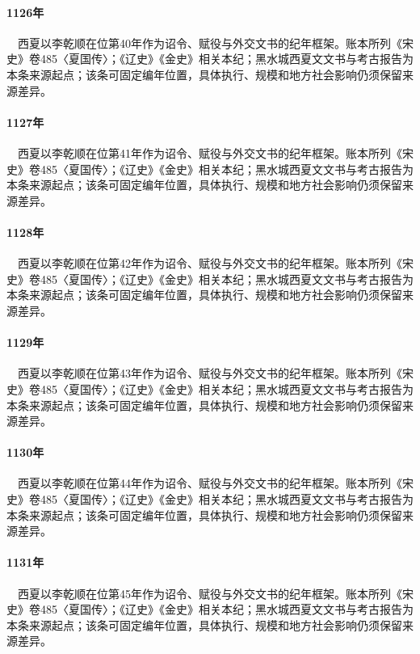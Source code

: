 \paragraph{1126年}　西夏以李乾顺在位第40年作为诏令、赋役与外交文书的纪年框架。账本所列《宋史》卷485〈夏国传〉；《辽史》《金史》相关本纪；黑水城西夏文文书与考古报告为本条来源起点；该条可固定编年位置，具体执行、规模和地方社会影响仍须保留来源差异。

\paragraph{1127年}　西夏以李乾顺在位第41年作为诏令、赋役与外交文书的纪年框架。账本所列《宋史》卷485〈夏国传〉；《辽史》《金史》相关本纪；黑水城西夏文文书与考古报告为本条来源起点；该条可固定编年位置，具体执行、规模和地方社会影响仍须保留来源差异。

\paragraph{1128年}　西夏以李乾顺在位第42年作为诏令、赋役与外交文书的纪年框架。账本所列《宋史》卷485〈夏国传〉；《辽史》《金史》相关本纪；黑水城西夏文文书与考古报告为本条来源起点；该条可固定编年位置，具体执行、规模和地方社会影响仍须保留来源差异。

\paragraph{1129年}　西夏以李乾顺在位第43年作为诏令、赋役与外交文书的纪年框架。账本所列《宋史》卷485〈夏国传〉；《辽史》《金史》相关本纪；黑水城西夏文文书与考古报告为本条来源起点；该条可固定编年位置，具体执行、规模和地方社会影响仍须保留来源差异。

\paragraph{1130年}　西夏以李乾顺在位第44年作为诏令、赋役与外交文书的纪年框架。账本所列《宋史》卷485〈夏国传〉；《辽史》《金史》相关本纪；黑水城西夏文文书与考古报告为本条来源起点；该条可固定编年位置，具体执行、规模和地方社会影响仍须保留来源差异。

\paragraph{1131年}　西夏以李乾顺在位第45年作为诏令、赋役与外交文书的纪年框架。账本所列《宋史》卷485〈夏国传〉；《辽史》《金史》相关本纪；黑水城西夏文文书与考古报告为本条来源起点；该条可固定编年位置，具体执行、规模和地方社会影响仍须保留来源差异。

